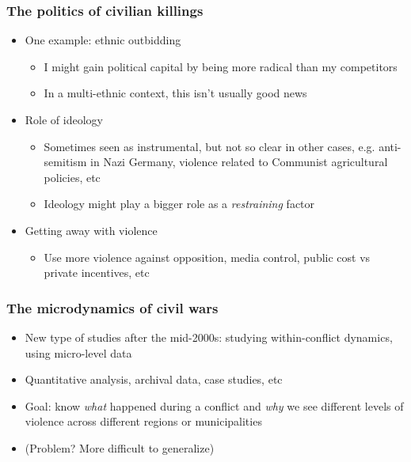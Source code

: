 \documentclass[aspectratio=43]{beamer}
\begin{document}
\begin{frame}
\frametitle{The politics of civilian killings}
\centering

\begin{itemize}
  \item<1-> One example: ethnic outbidding
  \begin{itemize}
    \item I might gain political capital by being more radical than my competitors
    \item In a multi-ethnic context, this isn't usually good news
  \end{itemize}
  \item<2-> Role of ideology
  \begin{itemize}
    \item Sometimes seen as instrumental, but not so clear in other cases, e.g. anti-semitism in Nazi Germany, violence related to Communist agricultural policies, etc
    \item Ideology might play a bigger role as a \textit{restraining} factor
  \end{itemize}
  \item<3-> Getting away with violence
  \begin{itemize}
    \item Use more violence against opposition, media control, public cost vs private incentives, etc
  \end{itemize}
  \end{itemize}

\end{frame}


\begin{frame}
\frametitle{The microdynamics of civil wars}
\centering

\begin{itemize}[<+->]
  \item New type of studies after the mid-2000s: studying within-conflict dynamics, using micro-level data
  \item Quantitative analysis, archival data, case studies, etc
  \item Goal: know \textit{what} happened during a conflict and \textit{why} we see different levels of violence across different regions or municipalities
  \item (Problem? More difficult to generalize)
\end{itemize}

\end{frame}
\end{document}
